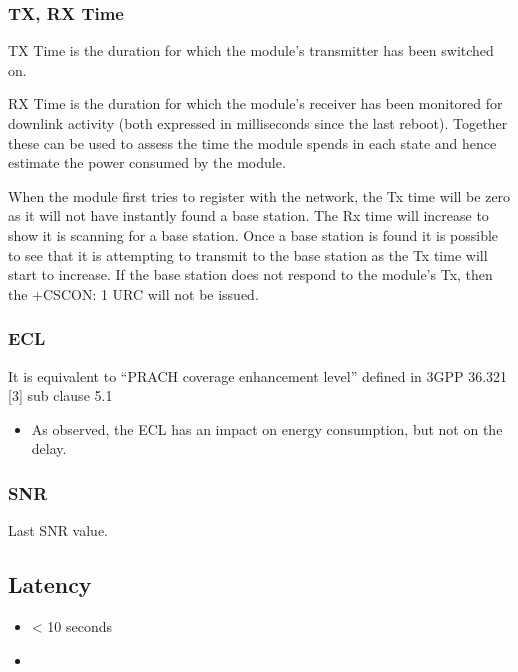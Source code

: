 \documentclass[]{article}
\providecommand{\tightlist}{%
  \setlength{\itemsep}{0pt}\setlength{\parskip}{0pt}}
\begin{document}
\hypertarget{tx-rx-time}{%
\subsubsection{TX, RX Time}\label{tx-rx-time}}

TX Time is the duration for which the module's transmitter has been
switched on.

RX Time is the duration for which the module's receiver has been
monitored for downlink activity (both expressed in milliseconds since
the last reboot). Together these can be used to assess the time the
module spends in each state and hence estimate the power consumed by the
module.

When the module first tries to register with the network, the Tx time
will be zero as it will not have instantly found a base station. The Rx
time will increase to show it is scanning for a base station. Once a
base station is found it is possible to see that it is attempting to
transmit to the base station as the Tx time will start to increase. If
the base station does not respond to the module's Tx, then the +CSCON: 1
URC will not be issued.

\hypertarget{ecl}{%
\subsubsection{ECL}\label{ecl}}

It is equivalent to ``PRACH coverage enhancement level'' defined in 3GPP
36.321 {[}3{]} sub clause 5.1

\begin{itemize}
\tightlist
\item
  As observed, the ECL has an impact on energy consumption, but not on
  the delay.
\end{itemize}

\hypertarget{snr}{%
\subsubsection{SNR}\label{snr}}

Last SNR value.

\hypertarget{latency}{%
\subsection{Latency}\label{latency}}

\begin{itemize}
\item
  \textless{} 10 seconds
\item
\end{itemize}
\end{document}
